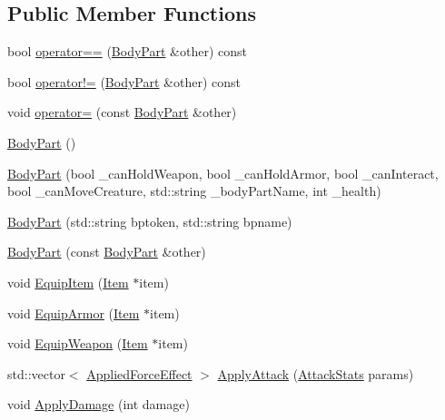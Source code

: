 \subsection*{Public Member Functions}
\begin{DoxyCompactItemize}
\item 
bool \mbox{\hyperlink{class_body_part_a9fa30957d2740122ef8d3bf1905c2dda}{operator==}} (\mbox{\hyperlink{class_body_part}{Body\+Part}} \&other) const
\item 
bool \mbox{\hyperlink{class_body_part_aa5df801cc11333d0adeaa5235c70bc7c}{operator!=}} (\mbox{\hyperlink{class_body_part}{Body\+Part}} \&other) const
\item 
void \mbox{\hyperlink{class_body_part_af4df2320cea8651ff589a57778ba4eee}{operator=}} (const \mbox{\hyperlink{class_body_part}{Body\+Part}} \&other)
\item 
\mbox{\hyperlink{class_body_part_a9599eb919a1223d5597f85fedd74085a}{Body\+Part}} ()
\item 
\mbox{\hyperlink{class_body_part_a84e12a892612a548a4fd605835290557}{Body\+Part}} (bool \+\_\+can\+Hold\+Weapon, bool \+\_\+can\+Hold\+Armor, bool \+\_\+can\+Interact, bool \+\_\+can\+Move\+Creature, std\+::string \+\_\+body\+Part\+Name, int \+\_\+health)
\item 
\mbox{\hyperlink{class_body_part_ac09038a5c7837d63f5f2b97747a88854}{Body\+Part}} (std\+::string bptoken, std\+::string bpname)
\item 
\mbox{\hyperlink{class_body_part_a605504c8f1ce6c8977c409c052b82633}{Body\+Part}} (const \mbox{\hyperlink{class_body_part}{Body\+Part}} \&other)
\item 
void \mbox{\hyperlink{class_body_part_a33d24af8ecd0eb34d39d54550fc0f604}{Equip\+Item}} (\mbox{\hyperlink{class_item}{Item}} $\ast$item)
\item 
void \mbox{\hyperlink{class_body_part_aa12ae5563a19cabd664731bbba3c7ea6}{Equip\+Armor}} (\mbox{\hyperlink{class_item}{Item}} $\ast$item)
\item 
void \mbox{\hyperlink{class_body_part_a6af5139c60c7b96bff6d8768c9ef8f22}{Equip\+Weapon}} (\mbox{\hyperlink{class_item}{Item}} $\ast$item)
\item 
std\+::vector$<$ \mbox{\hyperlink{struct_applied_force_effect}{Applied\+Force\+Effect}} $>$ \mbox{\hyperlink{class_body_part_aed6e734467a8cd25b4be8bc18edc9033}{Apply\+Attack}} (\mbox{\hyperlink{struct_attack_stats}{Attack\+Stats}} params)
\item 
void \mbox{\hyperlink{class_body_part_ae8ee6c320cd7ad82ec2c674357d16b80}{Apply\+Damage}} (int damage)

\end{DoxyCompactItemize}
